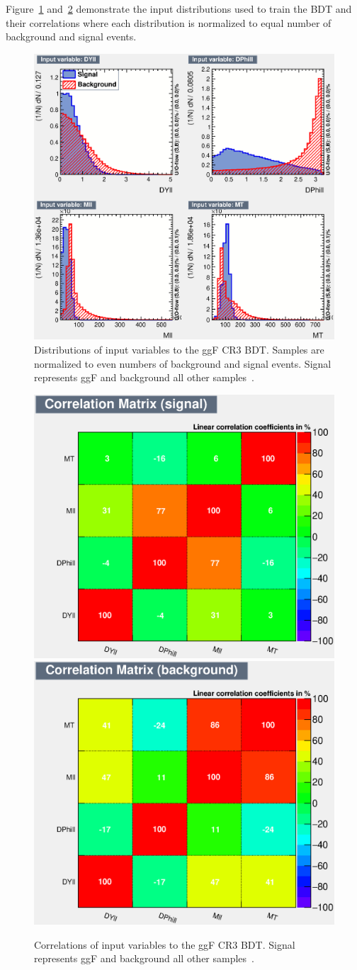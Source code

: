 Figure~\ref{fig:ggFCR3BDTinput} and~\ref{fig:ggFCR3corrSB} demonstrate the input distributions used to train the BDT and their correlations where each distribution is normalized to equal number of background and signal events. 

\begin{figure}[!htbp]
    \centering
    \includegraphics[width=0.7\linewidth]{Pictures/ggFCR3/variables_id_c1.eps}
    \caption{Distributions of input variables to the ggF CR3 BDT. Samples are normalized to even numbers of background and signal events. Signal represents ggF and background all other samples~\cite{ourSupportNote}.}
    \label{fig:ggFCR3BDTinput}
\end{figure}
\begin{figure}[!htbp]
\centering
  \includegraphics[width=.45\linewidth]{Pictures/ggFCR3/CorrelationMatrixS.eps}
  \includegraphics[width=.45\linewidth]{Pictures/ggFCR3/CorrelationMatrixB.eps}
\caption{Correlations of input variables to the ggF CR3 BDT. Signal represents ggF and background all other samples~\cite{ourSupportNote}.}
\label{fig:ggFCR3corrSB}
\end{figure}


